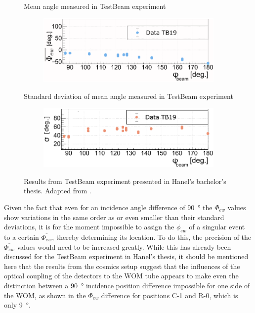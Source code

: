     \begin{figure}
    	\centering
    	
    Mean angle measured in TestBeam experiment	
    
    	\begin{subfigure}{\textwidth}
    		\centering
    		\includegraphics[width=.75\textwidth]{pictures/hanel_phi-ew.pdf}
    		\caption{}
    		\label{fig:hanel-phi}
    	\end{subfigure}
    \vspace{.5cm}
    
    Standard deviation of mean angle measured in TestBeam experiment
    
	    \begin{subfigure}{\textwidth}
	    	\centering
	    	\includegraphics[width=.75\textwidth]{pictures/hanel_phi-std.pdf}
	    	\caption{}
	    	\label{fig:hanel-std}
	    \end{subfigure}
    \caption{Results from TestBeam experiment presented in Hanel's bachelor's thesis. Adapted from \cite{HANEL}.}
    \end{figure}
    
    
    Given the fact that even for an incidence angle difference of \SI{90}{\degree} the $\overline{\Phi_{ew}}$ values show variations in the same order as or even smaller than their standard deviations, it is for the moment impossible to assign the $\phi_{ew}$ of a singular event to a certain $\overline{\Phi_{ew}}$, thereby determining its location. To do this, the precision of the $\overline{\Phi_{ew}}$ values would need to be increased greatly. While this has already been discussed for the TestBeam experiment in Hanel's thesis, it should be mentioned here that the results from the cosmics setup suggest that the influences of the optical coupling of the detectors to the \ac{WOM} tube appears to make even the distinction between a \SI{90}{\degree} incidence position difference impossible for one side of the \ac{WOM}, as shown in the $\overline{\Phi_{ew}}$ difference for positions C-1 and R-0, which is only \SI{9}{\degree}. 
    
